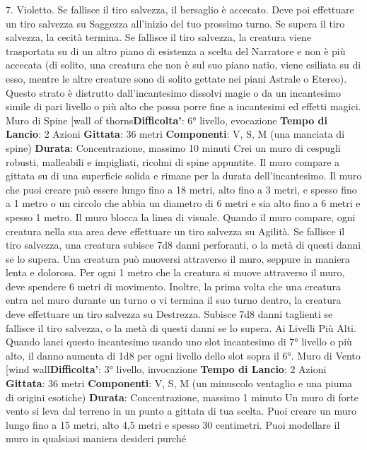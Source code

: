 \begin{multicols}{2}
7. Violetto. Se fallisce il tiro salvezza, il bersaglio è
accecato. Deve poi effettuare un tiro salvezza su
Saggezza all’inizio del tuo prossimo turno. Se supera il
tiro salvezza, la cecità termina. Se fallisce il tiro
salvezza, la creatura viene trasportata su di un altro
piano di esistenza a scelta del Narratore e non è più accecata
(di solito, una creatura che non è sul suo piano natio,
viene esiliata su di esso, mentre le altre creature sono
di solito gettate nei piani Astrale o Etereo). Questo
strato è distrutto dall’incantesimo dissolvi magie o da un
incantesimo simile di pari livello o più alto che possa
porre fine a incantesimi ed effetti magici.
Muro di Spine
[wall of thorns\textbf{Difficolta'}:
6° livello, evocazione
\textbf{Tempo di Lancio}: 2 Azioni
\textbf{Gittata}: 36 metri
\textbf{Componenti}: V, S, M (una manciata di spine)
\textbf{Durata}: Concentrazione, massimo 10 minuti
Crei un muro di cespugli robusti, malleabili e impigliati,
ricolmi di spine appuntite. Il muro compare a gittata su
di una superficie solida e rimane per la durata
dell’incantesimo. Il muro che puoi creare può essere
lungo fino a 18 metri, alto fino a 3 metri, e spesso fino a
1 metro o un circolo che abbia un diametro di 6 metri e
sia alto fino a 6 metri e spesso 1 metro. Il muro blocca
la linea di visuale.
Quando il muro compare, ogni creatura nella sua area
deve effettuare un tiro salvezza su Agilità. Se
fallisce il tiro salvezza, una creatura subisce 7d8 danni
perforanti, o la metà di questi danni se lo supera.
Una creatura può muoversi attraverso il muro, seppure
in maniera lenta e dolorosa. Per ogni 1 metro che la
creatura si muove attraverso il muro, deve spendere 6
metri di movimento. Inoltre, la prima volta che una
creatura entra nel muro durante un turno o vi termina il
suo turno dentro, la creatura deve effettuare un tiro
salvezza su Destrezza. Subisce 7d8 danni taglienti se
fallisce il tiro salvezza, o la metà di questi danni se lo
supera.
Ai Livelli Più Alti. Quando lanci questo incantesimo
usando uno slot incantesimo di 7° livello o più alto, il
danno aumenta di 1d8 per ogni livello dello slot sopra il
6°.
Muro di Vento
[wind wall\textbf{Difficolta'}:
3° livello, invocazione
\textbf{Tempo di Lancio}: 2 Azioni
\textbf{Gittata}: 36 metri
\textbf{Componenti}: V, S, M (un minuscolo ventaglio e una
piuma di origini esotiche)
\textbf{Durata}: Concentrazione, massimo 1 minuto
Un muro di forte vento si leva dal terreno in un punto a
gittata di tua scelta. Puoi creare un muro lungo fino a 15
metri, alto 4,5 metri e spesso 30 centimetri. Puoi
modellare il muro in qualsiasi maniera desideri purché

\end{multicols}
